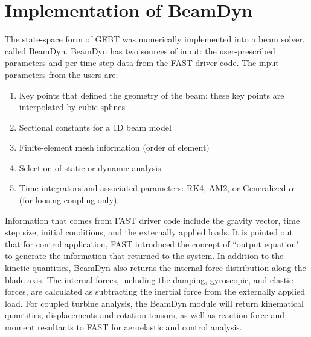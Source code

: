 \documentclass{aiaa-tc}
\begin{document}
\section{Implementation of BeamDyn}
The state-space form of GEBT was numerically implemented into a beam solver, called BeamDyn. BeamDyn has two sources of input:  the user-prescribed parameters and per time step data from the FAST driver code. The input parameters from the users are:
\begin{enumerate}
    \item Key points that defined the geometry of the beam; these key points are interpolated by cubic splines
    \item Sectional constants for a 1D beam model
    \item Finite-element mesh information (order of element)
    \item Selection of static \cite{Wang:GEBT2014} or dynamic analysis
    \item Time integrators and associated parameters: RK4, AM2, or Generalized-$\alpha$ (for loosing coupling only).
\end{enumerate}
Information that comes from FAST driver code include the gravity vector, time step size, initial conditions, and the externally applied loads. It is pointed out that for control application, FAST introduced the concept of ``output equation" to generate the information that returned to the system. In addition to the kinetic quantities, BeamDyn also returns the internal force distribution along the blade axis. The internal forces, including the damping, gyroscopic, and elastic forces, are calculated as subtracting the inertial force from the externally applied load. For coupled turbine analysis, the BeamDyn module will return kinematical quantities, displacements and rotation tensors, as well as reaction force and moment resultants to FAST for aeroelastic and control analysis.
\end{document}
